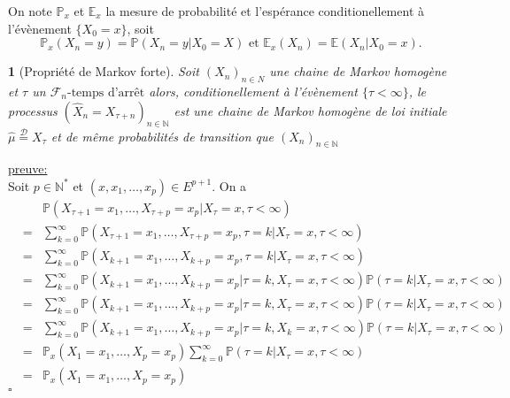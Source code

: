\documentclass[8pt,notheorems]{beamer}
\def \E{\mathbb E}
\def \N{\mathbb N}
\def \P {\mathbb P}
\renewcommand{\Pr}{\mathbb{P}}
\newtheorem{theorem}{\translate{Theorem}}[section]
\newtheorem{theorem}{\translate{Theoreme}}
\theoremstyle{definition}
\theoremstyle{example}
\theoremstyle{mystyle}
\theoremstyle{plain}
\begin{document}
\begin{frame}[allowframebreaks]
On note $\P_x$ et $\E_x$ la mesure de probabilité et l'espérance conditionellement à l'évènement $\{X_0 = x\}$, soit
$$
\P_x(X_n = y) = \P(X_n = y|X_0 = X)\text{ et }\E_x(X_n) = \E(X_n|X_0 = x).
$$
\begin{theorem}[Propriété de Markov forte]
Soit $(X_n)_{n\in N}$ une chaine de Markov homogène et $\tau$ un $\mathcal{F}_n\text{-temps d'arrêt}$ alors, conditionellement à l'évènement $\{\tau<\infty\}$, le processus $(\widehat{X}_n=X_{\tau+n})_{n\in\N}$ est une chaine de Markov homogène de loi initiale $\widehat{\mu}\overset{\mathcal{D}}{=}X_{\tau}$ et de même probabilités de transition que $(X_n)_{n\in\N}$
\end{theorem}
\underline{preuve:}\\
Soit $p\in\N^{\ast}$ et $(x,x_1,\ldots, x_p)\in E^{p+1}$. On a
\begin{eqnarray*}
&&\Pr(X_{\tau+1}=x_1,\ldots, X_{\tau+p}=x_p|X_\tau=x,\tau<\infty)\\
&=&\sum_{k=0}^{\infty}\Pr(X_{\tau+1}=x_1,\ldots, X_{\tau+p}=x_p,\tau=k|X_\tau=x,\tau<\infty)\\
 &=&\sum_{k=0}^{\infty}\Pr(X_{k+1}=x_1,\ldots, X_{k+p}=x_p,\tau=k|X_\tau=x,\tau<\infty)\\
 &=&\sum_{k=0}^{\infty}\Pr(X_{k+1}=x_1,\ldots, X_{k+p}=x_p|\tau=k,X_\tau=x,\tau<\infty)\Pr(\tau=k|X_\tau=x,\tau<\infty)\\
&=&\sum_{k=0}^{\infty}\Pr(X_{k+1}=x_1,\ldots, X_{k+p}=x_p|\tau=k,X_\tau=x,\tau<\infty)\Pr(\tau=k|X_\tau=x,\tau<\infty)\\
&=&\sum_{k=0}^{\infty}\Pr(X_{k+1}=x_1,\ldots, X_{k+p}=x_p|\tau=k,X_k=x,\tau<\infty)\Pr(\tau=k|X_\tau=x,\tau<\infty)\\
&=&\Pr_x(X_{1}=x_1,\ldots, X_{p}=x_p)\sum_{k=0}^{\infty}\Pr(\tau=k|X_\tau=x,\tau<\infty)\\
&=&\Pr_x(X_{1}=x_1,\ldots, X_{p}=x_p)
\end{eqnarray*}
$\square$
\end{frame}
\end{document}

